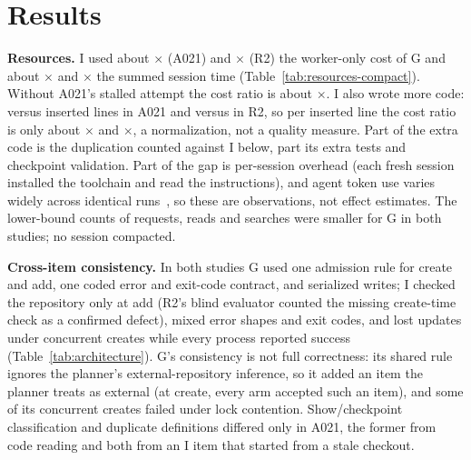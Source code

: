 \documentclass[10pt,conference]{IEEEtran}
\newcommand{\G}{G}
\newcommand{\I}{I}
\begin{document}
\section{Results}



\textbf{Resources.} \I{} used about \AcostRatio$\times$ (A021) and \RtwoCostRatio$\times$ (R2) the worker-only cost of \G{} and about \AactiveRatio$\times$ and \RtwoActiveRatio$\times$ the summed session time (Table~\ref{tab:resources-compact}). %
Without A021's stalled attempt the cost ratio is about \AcostExclStalledRatio$\times$. %
\I{} also wrote more code: \AinsLinesIndep{} versus \AinsLinesGrouped{} inserted lines in A021 and \RtwoInsLinesIndep{} versus \RtwoInsLinesGrouped{} in R2, so per inserted line the cost ratio is only about \AcostPerLineRatio$\times$ and \RtwoCostPerLineRatio$\times$, a normalization, not a quality measure. Part of the extra code is the duplication counted against \I{} below, part its extra tests and checkpoint validation. %
Part of the gap is per-session overhead (each fresh session installed the toolchain and read the instructions), and agent token use varies widely across identical runs~\cite{bai2026tokens}, so these are observations, not effect estimates. %
The lower-bound counts of requests, reads and searches were smaller for \G{} in both studies; no session compacted. %



\textbf{Cross-item consistency.} In both studies \G{} used one admission rule for create and add, one coded error and exit-code contract, and serialized writes; \I{} checked the repository only at add (R2's blind evaluator counted the missing create-time check as a confirmed defect), mixed error shapes and exit codes, and lost updates under concurrent creates while every process reported success (Table~\ref{tab:architecture}). %
\G's consistency is not full correctness: its shared rule ignores the planner's external-repository inference, so it added an item the planner treats as external (at create, every arm accepted such an item), and some of its concurrent creates failed under lock contention. %
Show/checkpoint classification and duplicate definitions differed only in A021, the former from code reading and both from an \I{} item that started from a stale checkout. %
\end{document}
